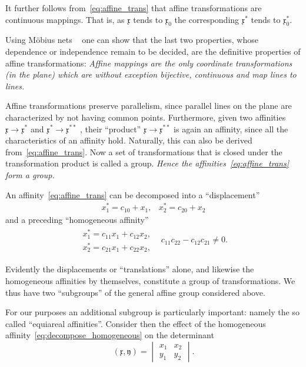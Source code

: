 \documentclass[11pt]{book} \usepackage{amssymb}
\newcommand{\myvec}[1]{\mathfrak{#1}}
\begin{document}
It further follows from~\eqref{eq:affine_trans} that affine transformations are
continuous mappings. That is, as $\myvec{x}$ tends to $\myvec{x}_0$ the 
corresponding $\myvec{x}^*$ tends to $\myvec{x}^*_0$.

Using M\"obius nets ~\cite{Mobius:1827} one can show that the last
two properties, whose dependence or independence remain to be decided, are
the definitive properties of affine transformations: {\em Affine mappings are
the only coordinate transformations (in the plane) which are without
exception bijective, continuous and map lines to lines.}

Affine transformations preserve parallelism, since parallel lines on the plane
are characterized by not having common points. Furthermore, given two 
affinities $\myvec{x}\to\myvec{x}^*$ and $\myvec{x}^*\to\myvec{x}^{**}$ , their
``product'' $\myvec{x}\to\myvec{x}^{**}$ is again an affinity, since all the
characteristics of an affinity hold. Naturally, this can also be derived 
from~\eqref{eq:affine_trans}. Now a set of transformations that is closed under
the transformation product is called a group. {\em Hence the 
affinities~\eqref{eq:affine_trans} form a group.}

An affinity~\eqref{eq:affine_trans} can be decomposed into a ``displacement''
\begin{equation}
  \label{eq:decompose_displacement}
  \begin{array}{ll}
    x_1^*=c_{10}+x_1,& x_2^*=c_{20}+x_2
  \end{array}
\end{equation}
and a preceding ``homogeneous affinity''
\begin{equation}
  \label{eq:decompose_homogeneous}
  \begin{array}{ll}
    \begin{array}{l}
      x_1^*=c_{11}x_1+c_{12}x_2,\\
      x_2^*=c_{21}x_1+c_{22}x_2,
    \end{array}
    & c_{11}c_{22}-c_{12}c_{21}\neq 0.
  \end{array}
\end{equation}

Evidently the displacements or ``translations'' alone, and likewise the 
homogeneous affinities by themselves, constitute a group of transformations.
We thus have two ``subgroups'' of the general affine group considered above.

For our purposes an additional subgroup is particularly important: namely the
so called ``equiareal affinities''. Consider then the effect of the homogeneous
affinity~\eqref{eq:decompose_homogeneous} on the determinant
\begin{equation}
  \label{eq:xy_determinant}
  (\myvec{x},\myvec{y})=\begin{vmatrix}x_1&x_2\\y_1&y_2\end{vmatrix}.
\end{equation}
\end{document}
